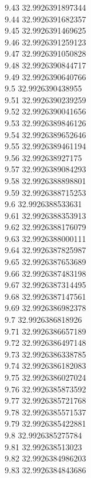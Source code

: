{9.43	32.9926391897344\\
9.44	32.9926391682357\\
9.45	32.9926391469625\\
9.46	32.9926391259123\\
9.47	32.9926391050828\\
9.48	32.9926390844717\\
9.49	32.9926390640766\\
9.5	32.9926390438955\\
9.51	32.9926390239259\\
9.52	32.9926390041656\\
9.53	32.9926389846126\\
9.54	32.9926389652646\\
9.55	32.9926389461194\\
9.56	32.992638927175\\
9.57	32.9926389084293\\
9.58	32.9926388898801\\
9.59	32.9926388715253\\
9.6	32.9926388533631\\
9.61	32.9926388353913\\
9.62	32.9926388176079\\
9.63	32.9926388000111\\
9.64	32.9926387825987\\
9.65	32.9926387653689\\
9.66	32.9926387483198\\
9.67	32.9926387314495\\
9.68	32.9926387147561\\
9.69	32.9926386982378\\
9.7	32.9926386818926\\
9.71	32.9926386657189\\
9.72	32.9926386497148\\
9.73	32.9926386338785\\
9.74	32.9926386182083\\
9.75	32.9926386027024\\
9.76	32.9926385873592\\
9.77	32.9926385721768\\
9.78	32.9926385571537\\
9.79	32.9926385422881\\
9.8	32.9926385275784\\
9.81	32.992638513023\\
9.82	32.9926384986203\\
9.83	32.9926384843686\\
}
